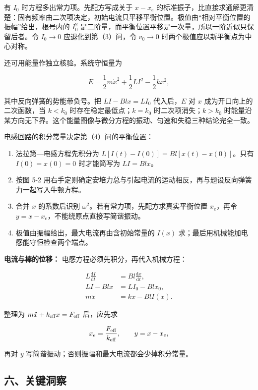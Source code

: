 \documentclass[12pt,a4paper,UTF8]{ctexart}
\newcommand{\tightlist}{\setlength{\itemsep}{0pt}\setlength{\parskip}{0pt}}
\begin{document}
有 \(I_0\) 时方程多出常力项。先配方写成关于 \(x-x_e\)
的标准振子，比直接求通解更清楚：固有频率由二次项决定，初始电流只平移平衡位置。极值由``相对平衡位置的振幅''给出，根号内的
\(I_0^2\) 是二阶量，而平衡位置平移是一次量，所以一阶近似只保留后者。令
\(I_0\to0\) 应退化到第（3）问，令 \(v_0\to0\)
时两个极值应以新平衡点为中心对称。

还可用能量作独立核验。系统守恒量为

\[E=\frac12m\dot x^2+\frac12LI^2-\frac12kx^2,\]

其中反向弹簧的势能带负号。把 \(LI-Blx=LI_0\) 代入后，\(E\) 对 \(x\)
成为开口向上的二次函数，当 \(k<k_0\) 时存在稳定最低点；\(k=k_0\)
时二次项消失；\(k>k_0\)
时能量沿某方向无下界。这个能量图像与微分方程的振动、匀速和失稳三种结论完全一致。

电感回路的积分常量决定第（4）问的平衡位置：

\begin{enumerate}
\def\labelenumi{\arabic{enumi}.}
\tightlist
\item
  法拉第---电感方程先积分为 \(L[I(t)-I(0)]=Bl[x(t)-x(0)]\)。只有
  \(I(0)=x(0)=0\) 时才能简写为 \(LI=Blx\)。
\item
  按图 5-2
  用右手定则确定安培力总与引起电流的运动相反，再与题设反向弹簧力一起写入牛顿方程。
\item
  合并 \(x\) 的系数后识别 \(\omega^2\)。若有常力项，先配方求真实平衡位置
  \(x_e\)，再令 \(y=x-x_e\)，不能绕原点直接写简谐振动。
\item
  极值由振幅给出，最大电流再由含初始常量的 \(I(x)\)
  求；最后用机械能加电感能守恒检查两个端点。
\end{enumerate}

\textbf{电流与棒的位移：} 电感方程必须先积分，再代入机械方程：

\[\begin{aligned}
L\frac{\mathrm dI}{\mathrm dt}&=Bl\frac{\mathrm dx}{\mathrm dt},\\
LI-Blx&=LI_0-Blx_0,\\
m\ddot x&=kx-BlI(x).
\end{aligned}\]

整理为 \(m\ddot x+k_{\rm eff}x=F_{\rm eff}\) 后，应先求

\[x_e=\frac{F_{\rm eff}}{k_{\rm eff}},\qquad
y=x-x_e,\]

再对 \(y\) 写简谐振动；否则振幅和最大电流都会少掉积分常量。

\subsection{六、关键洞察}\label{ux516dux5173ux952eux6d1eux5bdf-4}
\end{document}
